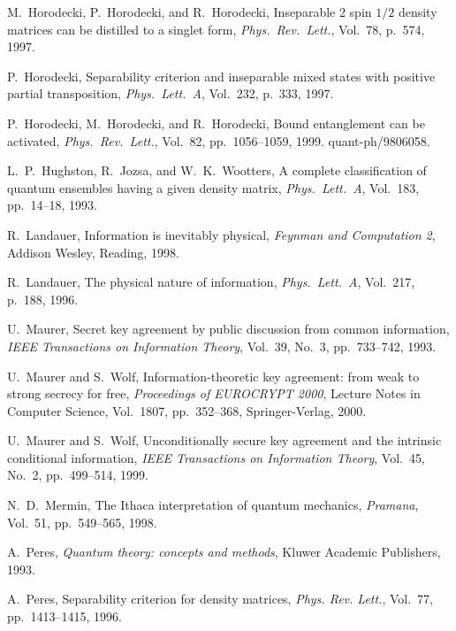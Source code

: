 \documentclass{article}
\begin{document}
\begin{thebibliography}{10}
M.~Horodecki, P.~Horodecki, and  R.~Horodecki, 
Inseparable 2 spin $1/2$ density matrices can be distilled to a singlet 
form, {\em Phys.\ Rev.\ Lett.}, Vol.~78, p.~574, 1997.




P.~Horodecki, Separability criterion and inseparable mixed states 
with positive partial transposition, 
{\em Phys.\ Lett.~A}, Vol.~232, p.~333, 1997.

       P.~Horodecki, M.~Horodecki, and  R.~Horodecki, 
Bound entanglement can be activated, 
{\em 
Phys.\ Rev.\ Lett.}, Vol.~82, pp.~1056--1059, 1999.
quant-ph/9806058.


 L.\, P.\ Hughston, R.\ Jozsa, and
W.\, K.\ Wootters, 
A complete classification of quantum ensembles having
      a given density matrix,
{\em Phys.\ Lett.~A}, Vol.~183, pp.~14--18, 1993.


R.\ Landauer, Information is inevitably physical, {\em Feynman and 
Computation 2}, Addison Wesley, Reading, 1998.

R.\ Landauer, The  physical nature of information, {\em Phys.\ Lett.\ A},
Vol.~217, p.~188, 1996.



 U.~Maurer, Secret key agreement by public discussion from
common information, {\em IEEE Transactions on Information Theory\/},
Vol.~39, No.~3, pp.~733--742, 1993.

U.~Maurer and S.~Wolf,
Information-theoretic key agreement: from weak to strong secrecy for free,
{\em Proceedings of EUROCRYPT 2000},
Lecture Notes in Computer Science, Vol.~1807, 
pp.~352--368, Springer-Verlag, 2000.

U.~Maurer and S.~Wolf, Unconditionally secure key agreement 
and the  intrinsic
conditional  information, 
{\em IEEE Transactions on Information Theory\/}, 
Vol.~45, No.~2, pp.~499--514, 1999.






N.\ D.\ Mermin, The Ithaca interpretation
of quantum mechanics,
{\em Pramana}, Vol.~51, pp.~549--565, 1998.




 A.~Peres, {\em Quantum theory: concepts and methods}, 
Kluwer Academic Publishers, 1993.

 A.~Peres, 
Separability criterion for density matrices,
{\em Phys. Rev. Lett.}, Vol.~77, pp.~1413--1415, 1996.



\end{thebibliography}
\end{document}

